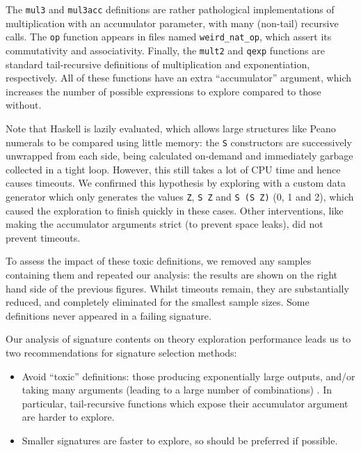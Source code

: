 The \texttt{mul3} and \texttt{mul3acc} definitions are rather pathological
implementations of multiplication with an accumulator parameter, with many
(non-tail) recursive calls. The \texttt{op} function appears in files named
\texttt{weird\_nat\_op}, which assert its commutativity and associativity.
Finally, the \texttt{mult2} and \texttt{qexp} functions are standard
tail-recursive definitions of multiplication and exponentiation, respectively.
All of these functions have an extra ``accumulator'' argument, which increases
the number of possible expressions to explore compared to those without.

Note that Haskell is lazily evaluated, which allows large structures like Peano
numerals to be compared using little memory: the \texttt{S} constructors are
successively unwrapped from each side, being calculated on-demand and
immediately garbage collected in a tight loop. However, this still takes a lot
of CPU time and hence causes timeouts. We confirmed this hypothesis by exploring
with a custom data generator which only generates the values \texttt{Z},
\texttt{S Z} and \texttt{S (S Z)} (0, 1 and 2), which caused the exploration to
finish quickly in these cases. Other interventions, like making the accumulator
arguments strict (to prevent space leaks), did not prevent timeouts.

To assess the impact of these toxic definitions, we removed any samples
containing them and repeated our analysis: the results are shown on the right
hand side of the previous figures. Whilst timeouts remain, they are
substantially reduced, and completely eliminated for the smallest sample sizes.
Some definitions never appeared in a failing signature.

Our analysis of signature contents on theory exploration performance leads us to
two recommendations for signature selection methods:

\begin{itemize}
\item Avoid ``toxic'' definitions: those producing exponentially large outputs,
  and/or taking many arguments (leading to a large number of combinations)
  \iffalse TODO: Alison: Is it always obvious which are toxic? \fi. In
  particular, tail-recursive functions which expose their accumulator argument
  are harder to explore. \iffalse TODO: Alison: These should be in the
  contributions and further recommendations based on your other findings in this
  chapter \fi
\item Smaller signatures are faster to explore, so should be preferred if
  possible.
\end{itemize}

